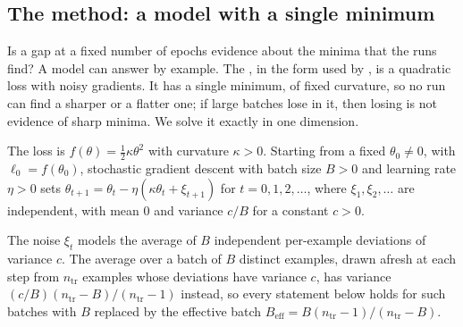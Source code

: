 \begin{refsection}
\section{The method: a model with a single minimum}\label{sec:heldfixed:nqm}

Is a gap at a fixed number of epochs evidence about the minima that the runs find? A model can answer by example. The , in the form used by \textcite{ZhangEtAl2019}, is a quadratic loss with noisy gradients. It has a single minimum, of fixed curvature, so no run can find a sharper or a flatter one; if large batches lose in it, then losing is not evidence of sharp minima. We solve it exactly in one dimension.

\begin{assumption}\label{ass:heldfixed:nqm}
The loss is $f(\theta)=\tfrac12\kappa\theta^2$ with curvature $\kappa>0$. Starting from a fixed $\theta_0\neq0$, with $\ell_0=f(\theta_0)$, stochastic gradient descent with batch size $B>0$ and learning rate $\eta>0$ sets $\theta_{t+1}=\theta_t-\eta(\kappa\theta_t+\xi_{t+1})$ for $t=0,1,2,\dots$, where $\xi_1,\xi_2,\dots$ are independent, with mean $0$ and variance $c/B$ for a constant $c>0$.
\end{assumption}

The noise $\xi_t$ models the average of $B$ independent per-example deviations of variance $c$. The average over a batch of $B$ distinct examples, drawn afresh at each step from $n_{\mathrm{tr}}$ examples whose deviations have variance $c$, has variance $(c/B)(n_{\mathrm{tr}}-B)/(n_{\mathrm{tr}}-1)$ instead, so every statement below holds for such batches with $B$ replaced by the effective batch $B_{\mathrm{eff}}=B(n_{\mathrm{tr}}-1)/(n_{\mathrm{tr}}-B)$.


\end{refsection}
